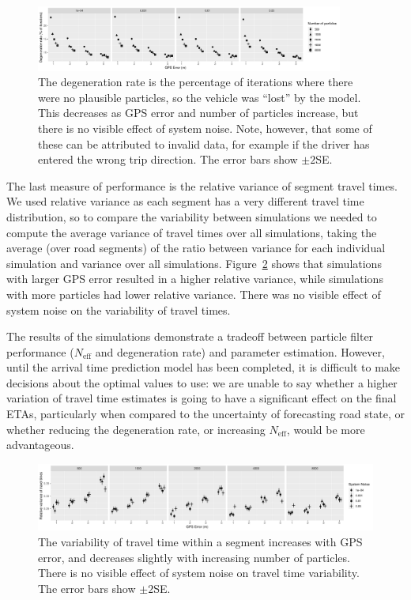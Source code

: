 \begin{figure}[tb]
    \centering
    \includegraphics[width=0.9\textwidth]{figures/04_model_results_degen.pdf}
    \caption{
        The degeneration rate is the percentage of iterations where there were no
        plausible particles, so the vehicle was ``lost'' by the model.
        This decreases as GPS error and number of particles increase,
        but there is no visible effect of system noise.
        Note, however, that some of these can be attributed to invalid data,
        for example if the driver has entered the wrong trip direction.
        The error bars show $\pm 2$SE.
    }
    \label{fig:degen_rate}
\end{figure}


The last measure of performance is the relative variance of segment travel times.
We used relative variance as each segment has a very different travel time distribution,
so to compare the variability between simulations we needed to 
compute the average variance of travel times over all simulations,
taking the average (over road segments) of the ratio between variance for
each individual simulation and variance over all simulations.
Figure~\ref{fig:travel_times} shows that simulations with larger GPS error
resulted in a higher relative variance,
while simulations with more particles had lower relative variance.
There was no visible effect of system noise on the variability of travel times.


The results of the simulations
demonstrate a tradeoff between particle filter performance
($N_\text{eff}$ and degeneration rate) and parameter estimation.
However, until the arrival time prediction model has been completed,
it is difficult to make decisions about the optimal values to use:
we are unable to say whether a higher variation of travel time estimates
is going to have a significant effect on the final ETAs,
particularly when compared to the uncertainty of forecasting road state,
or whether reducing the degeneration rate, 
or increasing $N_\text{eff}$, would be more advantageous.


\begin{figure}[tb]
    \centering
    \includegraphics[width=\textwidth]{figures/04_model_results_times.pdf}
    \caption{
        The variability of travel time within a segment increases with GPS error,
        and decreases slightly with increasing number of particles.
        There is no visible effect of system noise on travel time variability.
        The error bars show $\pm 2$SE.
    }
    \label{fig:travel_times}
\end{figure}


